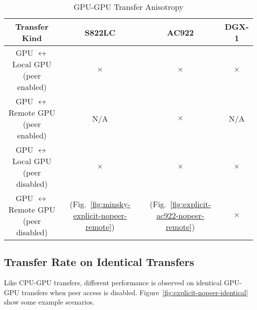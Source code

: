 \begin{table}[ht]
	\centering
	\caption[GPU-GPU Transfer Anisotropy]{GPU-GPU Transfer Anisotropy}
	\label{tab:explicit-peer-direction}
	\begin{tabular}{cccc}
		\hline
		\textbf{Transfer Kind}                           & \textbf{S822LC}                                           & \textbf{AC922}                                           & \textbf{DGX-1} \\ \hline 
		\makecell{ GPU $\leftrightarrow$ Local GPU  \\ (peer enabled)  } & $\times$                                                  & $\times$                                                 & $\times$       \\ \hline
		\makecell{ GPU $\leftrightarrow$ Remote GPU \\ (peer enabled)  } & N/A                                                       & $\times$                                                 & N/A            \\ \hline
		\makecell{ GPU $\leftrightarrow$ Local GPU  \\ (peer disabled) } & $\times$                                                  & $\times$                                                 & $\times$       \\ \hline
		\makecell{ GPU $\leftrightarrow$ Remote GPU \\ (peer disabled) } & \checkmark (Fig.~\ref{fig:minsky-explicit-nopeer-remote}) & \checkmark (Fig.~\ref{fig:explicit-ac922-nopeer-remote}) & $\times$       \\ \hline
	\end{tabular}
\end{table}

\subsection{Transfer Rate on Identical Transfers}
\label{sec:explicit-peer-identical}

Like CPU-GPU transfers, different performance is observed on identical GPU-GPU transfers when peer access is disabled.
Figure~\ref{fig:explicit-nopeer-identical} show some example scenarios.

